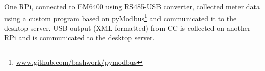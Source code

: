 \documentclass[10pt]{sensys-proc}
\newcommand{\secref}[1]{Section~\ref{#1}}
\newcommand{\tabref}[1]{Table~\ref{#1}}
\newcommand{\selstup}{SLsU}
\newcommand{\paradigms}{Sense Local-store Upload~}
\begin{document}
 One RPi, connected to EM6400 using RS485-USB converter, collected meter data using a custom program based on pyModbus\footnote{\url{www.github.com/bashwork/pymodbus}} and communicated it to the desktop server. %
USB output (XML formatted) from CC is collected on another RPi and is communicated to the desktop server. %

\end{document}
